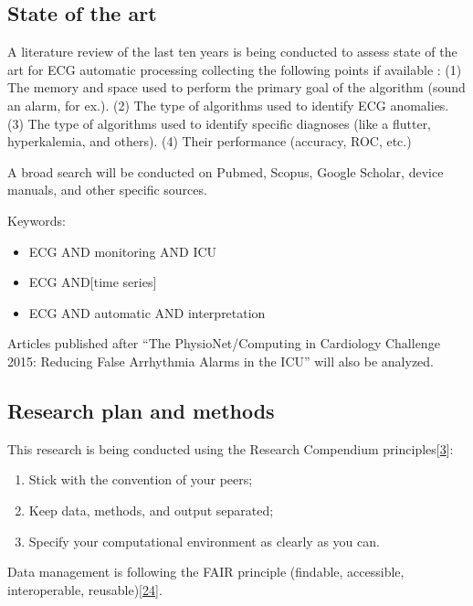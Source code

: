 \documentclass[runningheads]{llncs}
\providecommand{\tightlist}{%
  \setlength{\itemsep}{0pt}\setlength{\parskip}{0pt}}
\begin{document}
\hypertarget{state-of-the-art}{%
\subsection{State of the art}\label{state-of-the-art}}

A literature review of the last ten years is being conducted to assess
state of the art for ECG automatic processing collecting the following
points if available : (1) The memory and space used to perform the
primary goal of the algorithm (sound an alarm, for ex.). (2) The type of
algorithms used to identify ECG anomalies. (3) The type of algorithms
used to identify specific diagnoses (like a flutter, hyperkalemia, and
others). (4) Their performance (accuracy, ROC, etc.)

A broad search will be conducted on Pubmed, Scopus, Google Scholar,
device manuals, and other specific sources.

Keywords:

\begin{itemize}
\tightlist
\item
  ECG AND monitoring AND ICU
\item
  ECG AND{[}time series{]}
\item
  ECG AND automatic AND interpretation
\end{itemize}

Articles published after ``The PhysioNet/Computing in Cardiology
Challenge 2015: Reducing False Arrhythmia Alarms in the ICU'' will also
be analyzed.

\hypertarget{research-plan-and-methods}{%
\subsection{Research plan and methods}\label{research-plan-and-methods}}

This research is being conducted using the Research Compendium
principles{[}\protect\hyperlink{ref-compendium2019}{3}{]}:

\begin{enumerate}
\def\labelenumi{\arabic{enumi}.}
\tightlist
\item
  Stick with the convention of your peers;
\item
  Keep data, methods, and output separated;
\item
  Specify your computational environment as clearly as you can.
\end{enumerate}

Data management is following the FAIR principle (findable, accessible,
interoperable, reusable){[}\protect\hyperlink{ref-wilkinson2016}{24}{]}.
\end{document}
